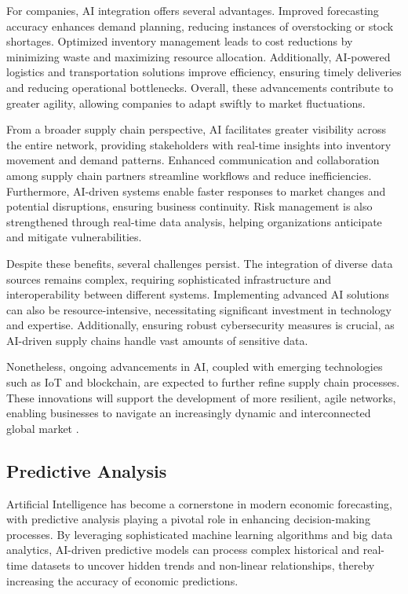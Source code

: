 For companies, AI integration offers several advantages. Improved forecasting accuracy enhances demand planning, reducing instances of overstocking or stock shortages. Optimized inventory management leads to cost reductions by minimizing waste and maximizing resource allocation. Additionally, AI-powered logistics and transportation solutions improve efficiency, ensuring timely deliveries and reducing operational bottlenecks. Overall, these advancements contribute to greater agility, allowing companies to adapt swiftly to market fluctuations.

From a broader supply chain perspective, AI facilitates greater visibility across the entire network, providing stakeholders with real-time insights into inventory movement and demand patterns. Enhanced communication and collaboration among supply chain partners streamline workflows and reduce inefficiencies. Furthermore, AI-driven systems enable faster responses to market changes and potential disruptions, ensuring business continuity. Risk management is also strengthened through real-time data analysis, helping organizations anticipate and mitigate vulnerabilities.

Despite these benefits, several challenges persist. The integration of diverse data sources remains complex, requiring sophisticated infrastructure and interoperability between different systems. Implementing advanced AI solutions can also be resource-intensive, necessitating significant investment in technology and expertise. Additionally, ensuring robust cybersecurity measures is crucial, as AI-driven supply chains handle vast amounts of sensitive data.

Nonetheless, ongoing advancements in AI, coupled with emerging technologies such as IoT and blockchain, are expected to further refine supply chain processes. These innovations will support the development of more resilient, agile networks, enabling businesses to navigate an increasingly dynamic and interconnected global market \cite{IBM-AI-Supply-Chain}.


\subsection{Predictive Analysis}
\label{subsec:predictive-analysis}

Artificial Intelligence has become a cornerstone in modern economic forecasting, with predictive analysis playing a pivotal role in enhancing decision-making processes. 
By leveraging sophisticated machine learning algorithms and big data analytics, AI-driven predictive models can process complex historical and real-time datasets to 
uncover hidden trends and non-linear relationships, thereby increasing the accuracy of economic predictions.

